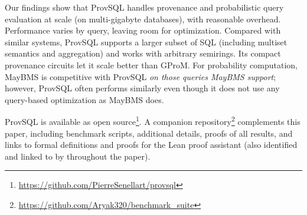 Our findings show that ProvSQL handles
provenance and probabilistic query evaluation at
scale (on multi-gigabyte databases), with reasonable overhead.
Performance varies by query, leaving room for
optimization. Compared with similar systems,
ProvSQL supports a larger subset of SQL
(including multiset semantics and aggregation)
and works with arbitrary semirings. Its
compact provenance circuits let it scale
better than GProM. For probability computation,
MayBMS is competitive with ProvSQL \emph{on those queries MayBMS support}; however,
ProvSQL often performs similarly even though it
does not use any
query-based optimization as MayBMS does.


ProvSQL is available as open source\footnote{\url{https://github.com/PierreSenellart/provsql}}. A companion
repository\footnote{\url{https://github.com/Aryak320/benchmark_suite}}
complements this paper, including benchmark scripts, additional details, proofs of
all results, and links to formal definitions and proofs for the Lean proof
assistant (also identified and linked to by \leanmain{} throughout the paper).
